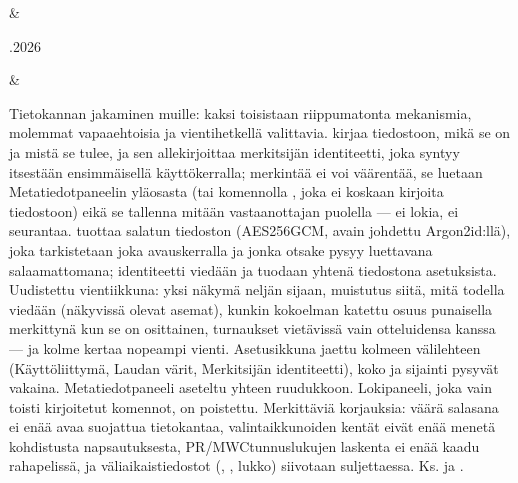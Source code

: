 \documentclass[letterpaper,10pt,finnish]{sphinxmanual}
\begin{document}
\begin{savenotes}
\begin{longtable}{}
&\begin{varwidth}[t]{}
.2026
\sphinxbeforeendvarwidth
\end{varwidth}%
&\begin{varwidth}[t]{}
\sphinxAtStartPar
Tietokannan jakaminen muille: kaksi toisistaan riippumatonta mekanismia, molemmat vapaaehtoisia ja vientihetkellä valittavia.  kirjaa tiedostoon, mikä se on ja mistä se tulee, ja sen allekirjoittaa merkitsijän identiteetti, joka syntyy itsestään ensimmäisellä käyttökerralla; merkintää ei voi väärentää, se luetaan Metatiedot\sphinxhyphen{}paneelin yläosasta (tai komennolla , joka ei koskaan kirjoita tiedostoon) eikä se tallenna mitään vastaanottajan puolella — ei lokia, ei seurantaa.  tuottaa salatun \sphinxhyphen{}tiedoston (AES\sphinxhyphen{}256\sphinxhyphen{}GCM, avain johdettu Argon2id:llä), joka tarkistetaan joka avauskerralla ja jonka otsake pysyy luettavana salaamattomana; identiteetti viedään ja tuodaan yhtenä tiedostona asetuksista. Uudistettu vienti\sphinxhyphen{}ikkuna: yksi näkymä neljän sijaan, muistutus siitä, mitä todella viedään (näkyvissä olevat asemat), kunkin kokoelman katettu osuus punaisella merkittynä kun se on osittainen, turnaukset vietävissä vain otteluidensa kanssa — ja kolme kertaa nopeampi vienti. Asetusikkuna jaettu kolmeen välilehteen (Käyttöliittymä, Laudan värit, Merkitsijän identiteetti), koko ja sijainti pysyvät vakaina. Metatiedot\sphinxhyphen{}paneeli aseteltu yhteen ruudukkoon. Loki\sphinxhyphen{}paneeli, joka vain toisti kirjoitetut komennot, on poistettu. Merkittäviä korjauksia: väärä salasana ei enää avaa suojattua tietokantaa, valintaikkunoiden kentät eivät enää menetä kohdistusta napsautuksesta, PR/MWC\sphinxhyphen{}tunnuslukujen laskenta ei enää kaadu rahapelissä, ja väliaikaistiedostot (, , lukko) siivotaan suljettaessa. Ks. {\hyperref[\detokenize{manuel:diffusion-controlee}]{}} ja {\hyperref[\detokenize{manuel:manuel}]{}}.
\sphinxbeforeendvarwidth
\end{varwidth}%
\\
\sphinxhline\begin{varwidth}[t]{}

\end{varwidth}
\end{longtable}
\end{savenotes}
\end{document}
